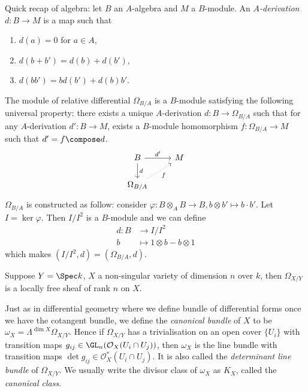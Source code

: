 \documentclass[a4paper]{article}
\newcommand{\sh}[1]{\mathcal{#1}} %
\begin{document}
Quick recap of algebra: let \(B\) an \(A\)-algebra and \(M\) a \(B\)-module. An \emph{\(A\)-derivation} \(d: B \to M\) is a map such that
\begin{enumerate}
\item \(d(a) = 0\) for \(a \in A\),
\item \(d(b + b') = d(b) + d(b')\),
\item \(d(bb') = b d(b') + d(b) b'\).
\end{enumerate}
The module of relative differential \(\Omega_{B/A}\) is a \(B\)-module satisfying the following universal property: there exists a unique \(A\)-derivation \(d: B \to \Omega_{B/A}\) such that for any \(A\)-derivation \(d': B \to M\), exists a \(B\)-module homomorphism \(f: \Omega_{B/A} \to M\) such that \(d' = f \compose d\).
\[
  \begin{tikzcd}
    B \ar[r, "d'"] \ar[d, "d"] & M \\
    \Omega_{B/A} \ar[ur, dotted, "f"']
  \end{tikzcd}
\]
\(\Omega_{B/A}\) is constructed as follow: consider \(\varphi: B \otimes_A B \to B, b \otimes b' \mapsto b \cdot b'\). Let \(I = \ker \varphi\). Then \(I/I^2\) is a \(B\)-module and we can define
\begin{align*}
  d: B &\to I/I^2 \\
  b &\mapsto 1 \otimes b - b \otimes 1
\end{align*}
which makes \((I/I^2, d) = (\Omega_{B/A}, d)\).

\begin{eg}
  Suppose \(Y = \Spec k\), \(X\) a non-singular variety of dimension \(n\) over \(k\), then \(\Omega_{X/Y}\) is a locally free sheaf of rank \(n\) on \(X\).
\end{eg}

Just as in differential geometry where we define bundle of differential forms once we have the cotangent bundle, we define the \emph{canonical bundle} of \(X\) to be \(\omega_X = \Lambda^{\dim X} \Omega_{X/Y}\). Hence if \(\Omega_{X/Y}\) has a trivialisation on an open cover \(\{U_i\}\) with transition maps \(g_{ij} \in \GL_n(\sh O_X(U_i \cap U_j))\), then \(\omega_X\) is the line bundle with transition maps \(\det g_{ij} \in \sh O_X^*(U_i \cap U_j)\). It is also called the \emph{determinant line bundle} of \(\Omega_{X/Y}\). We usually write the divisor class of \(\omega_X\) as \(K_X\), called the \emph{canonical class}.
\end{document}
